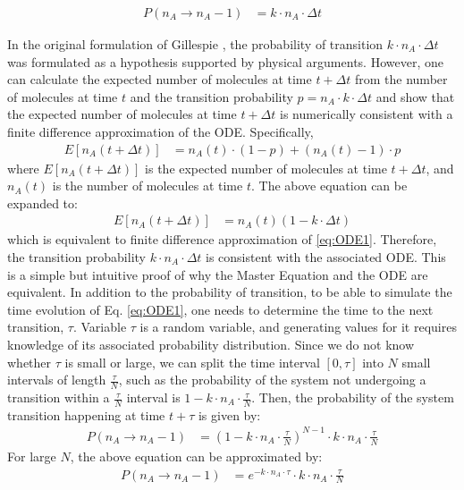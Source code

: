 \documentclass[12pt]{article}
\begin{document}
\begin{align}
P(n_A \rightarrow n_A-1) &= k \cdot n_A \cdot \Delta t
\label{eq:prob}
\end{align}

In the original formulation of Gillespie \cite{Gillespie1977}, the probability of transition $k \cdot n_A \cdot \Delta t$ was formulated as a hypothesis supported by physical arguments. However, one can calculate the expected number of molecules at time $t+\Delta t$ from the number of molecules at time $t$ and the transition probability $p=n_A \cdot k \cdot \Delta t$ and show that the expected number of molecules at time $t+\Delta t$ is numerically consistent with a finite difference approximation of the ODE.  Specifically,
\begin{align}
E[n_A(t+\Delta t)] &= n_A(t) \cdot (1-p) + (n_A(t)-1) \cdot p
\label{eq:expectation}
\end{align}
where $E[n_A(t+\Delta t)]$ is the expected number of molecules at time $t+\Delta t$, and $n_A(t)$ is the number of molecules at time $t$.  The above equation can be expanded to:
\begin{align}
E[n_A(t+\Delta t)] &= n_A(t) (1-k  \cdot \Delta t) 
\label{eq:expectation2}
\end{align}
which is equivalent to finite difference approximation of \ref{eq:ODE1}.  Therefore, the transition probability $k \cdot n_A \cdot \Delta t$ is consistent with the associated ODE.  This is a simple but intuitive proof of why the Master Equation and the ODE are equivalent.  In addition to the probability of transition, to be able to simulate the time evolution of Eq. \ref{eq:ODE1}, one needs to determine the time to the next transition, $\tau$. Variable $\tau$ is a random variable, and generating values for it requires knowledge of its associated probability distribution.  Since we do not know whether $\tau$ is small or large, we can split the time interval $[0,\tau]$ into $N$ small intervals of length $\frac {\tau} {N}$, such as the probability of the system not undergoing a transition within a $\frac {\tau} {N}$ interval is $1-k \cdot n_A \cdot \frac {\tau} {N}$.  Then, the probability of the system transition happening at time $t+\tau$ is given by:
\begin{align}
P(n_A \rightarrow n_A-1) &= (1-k \cdot n_A \cdot \frac {\tau} {N})^{N-1} \cdot k \cdot n_A \cdot \frac {\tau} {N}
\label{eq:prob2}
\end{align}
For large $N$, the above equation can be approximated by:
\begin{align}
P(n_A \rightarrow n_A-1) &= e^{-k \cdot n_A \cdot \tau} \cdot k \cdot n_A \cdot \frac \tau N
\label{eq:prob3}
\end{align}
\end{document}
